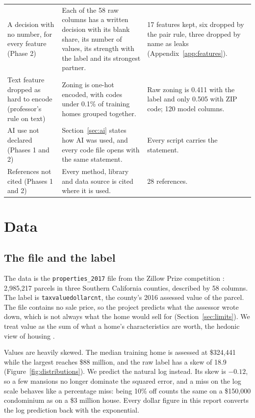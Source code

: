 \documentclass[sigconf,nonacm,10pt]{acmart}
\begin{document}
\begin{table}[t]
\begin{tabularx}{\textwidth}{@{}L{3.6cm}YY@{}}
A decision with no number, for every feature (Phase 2) & Each of the 58 raw columns has a written decision with its blank share, its number of values, its strength with the label and its strongest partner. & 17 features kept, six dropped by the pair rule, three dropped by name as leaks (Appendix~\ref{app:features}). \\
Text feature dropped as hard to encode (professor's rule on text) & Zoning is one-hot encoded, with codes under 0.1\% of training homes grouped together. & Raw zoning is 0.411 with the label and only 0.505 with ZIP code; 120 model columns. \\
AI use not declared (Phases 1 and 2) & Section~\ref{sec:ai} states how AI was used, and every code file opens with the same statement. & Every script carries the statement. \\
References not cited (Phases 1 and 2) & Every method, library and data source is cited where it is used. & 28 references. \\
\bottomrule
\end{tabularx}
\end{table}

\section{Data}
\label{sec:data}

\subsection{The file and the label}
The data is the \texttt{properties\_2017} file from the Zillow Prize competition \cite{zillowprize2017}: 2,985,217 parcels in three Southern California counties, described by 58 columns. The label is \texttt{taxvaluedollarcnt}, the county's 2016 assessed value of the parcel. The file contains no sale price, so the project predicts what the assessor wrote down, which is not always what the home would sell for (Section~\ref{sec:limits}). We treat value as the sum of what a home's characteristics are worth, the hedonic view of housing \cite{rosen1974hedonic}.

Values are heavily skewed. The median training home is assessed at \$324,441 while the largest reaches \$88 million, and the raw label has a skew of 18.9 (Figure~\ref{fig:distributions}). We predict the natural log instead. Its skew is $-0.12$, so a few mansions no longer dominate the squared error, and a miss on the log scale behaves like a percentage miss: being 10\% off counts the same on a \$150,000 condominium as on a \$3 million house. Every dollar figure in this report converts the log prediction back with the exponential.
\end{document}
